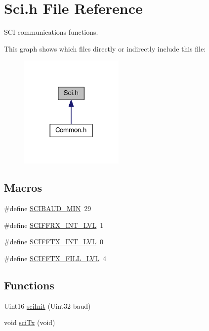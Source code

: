 \hypertarget{a00028}{\section{Sci.\-h File Reference}
\label{a00028}
}


S\-C\-I communications functions.  


This graph shows which files directly or indirectly include this file\-:\nopagebreak
\begin{figure}[H]
\begin{center}
\leavevmode
\includegraphics[width=144pt]{a00053}
\end{center}
\end{figure}
\subsection*{Macros}
\begin{DoxyCompactItemize}
\item 
\#define \hyperlink{a00028_a0e4c420431b12616b61e9f3a28f07e4d}{S\-C\-I\-B\-A\-U\-D\-\_\-\-M\-I\-N}~29
\item 
\#define \hyperlink{a00028_a5733933fffc18dbcb8bc9404e80bc493}{S\-C\-I\-F\-F\-R\-X\-\_\-\-I\-N\-T\-\_\-\-L\-V\-L}~1
\item 
\#define \hyperlink{a00028_a5340c9de55b8e5c65ef801d2dcabffd7}{S\-C\-I\-F\-F\-T\-X\-\_\-\-I\-N\-T\-\_\-\-L\-V\-L}~0
\item 
\#define \hyperlink{a00028_af0368b1c16e194a32bf4ce09eb937930}{S\-C\-I\-F\-F\-T\-X\-\_\-\-F\-I\-L\-L\-\_\-\-L\-V\-L}~4
\end{DoxyCompactItemize}
\subsection*{Functions}
\begin{DoxyCompactItemize}
\item 
Uint16 \hyperlink{a00028_a1f05b9c5226c73b67c1d6c3bf7f80b52}{sci\-Init} (Uint32 baud)
\item 
void \hyperlink{a00028_a941bdbf3e64ac5f4492a7f7c5936b445}{sci\-Tx} (void)
\end{DoxyCompactItemize}


